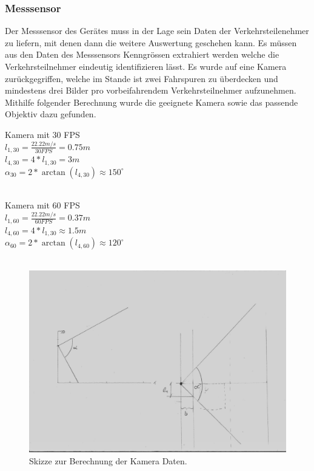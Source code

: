 \subsubsection{Messsensor}
Der Messsensor des Ger\"ates muss in der Lage sein  Daten der Verkehrsteilenehmer zu liefern, mit denen dann die weitere Auswertung geschehen kann. Es müssen aus den Daten des Messsensors Kenngr\"ossen extrahiert werden welche die Verkehrsteilnehmer eindeutig identifizieren lässt. Es wurde auf eine Kamera zurückgegriffen, welche im Stande ist zwei Fahrspuren zu überdecken und mindestens drei Bilder pro vorbeifahrendem Verkehrsteilnehmer aufzunehmen. \\
Mithilfe folgender Berechnung wurde die geeignete Kamera sowie das passende Objektiv dazu gefunden.
\begin{citemize}

\item Kamera mit 30 FPS \\
$l_{ 1,30 } = \frac{ 22.22 m/s }{ 30 FPS} = 0.75 m$ \\ 
$l_{ 4,30 } = 4 * l_{1,30} = 3 m$\\
$\alpha_{30} = 2* \arctan(l_{4,30 }) \approx 150^\circ$ \\\\


\item Kamera mit 60 FPS \\
$l_{ 1,60 } = \frac{ 22.22 m/s }{ 60 FPS} = 0.37 m$ \\ 
$l_{ 4,60 } = 4 * l_{1,30} \approx 1.5 m$\\
$\alpha_{60} = 2* \arctan(l_{4,60 }) \approx 120^\circ$ \\\\
\end{citemize}

\begin{figure}[H]
  \centering
  \includegraphics[height=0.49\textwidth]{Hardware/ObjektivBerechnung.jpg} 
  \caption{Skizze zur Berechnung der Kamera Daten.}
  \label{bArchitektur}
\end{figure}


